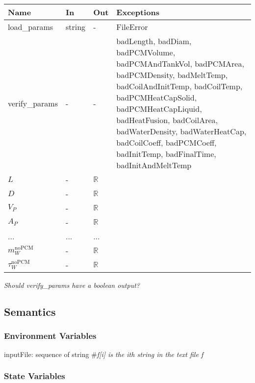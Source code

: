 \documentclass[12pt, titlepage]{article}
\begin{document}
\begin{tabular}{p{3cm} p{1cm} p{1cm} >{\raggedright\arraybackslash}p{9cm}}
\toprule
\textbf{Name} & \textbf{In} & \textbf{Out} & \textbf{Exceptions} \\
\midrule
load\_params & string & - &  FileError \\
verify\_params & - & - & badLength, badDiam, badPCMVolume, badPCMAndTankVol,
                        badPCMArea, badPCMDensity, badMeltTemp,
                        badCoilAndInitTemp, badCoilTemp, badPCMHeatCapSolid,
                        badPCMHeatCapLiquid, badHeatFusion, badCoilArea,
                        badWaterDensity, badWaterHeatCap, badCoilCoeff,
                        badPCMCoeff, badInitTemp, badFinalTime,
                        badInitAndMeltTemp \\
$L$ & - & $\mathbb{R}$\\
$D$ & - & $\mathbb{R}$\\
$V_P$ & - & $\mathbb{R}$\\
$A_P$ & - & $\mathbb{R}$\\
... & ... & ...\\
$m_W^{\text{noPCM}}$ & - & $\mathbb{R}$ \\
$\tau_W^{\text{noPCM}}$ & - & $\mathbb{R}$\\
\bottomrule
\end{tabular}

\textit{Should verify\_params have a boolean output?}

\subsection{Semantics}

\subsubsection{Environment Variables}

inputFile: sequence of string \#\textit{f[i] is the ith string in the text file f}\\ 

\subsubsection{State Variables}
\end{document}
